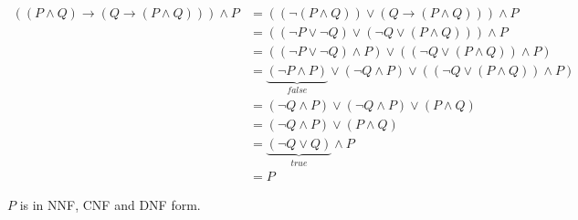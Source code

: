 \documentclass[a4paper,11pt]{report}
\begin{document}
\begin{align*}
  ((P \wedge Q) \to (Q \to (P \wedge Q))) \wedge P &= (( \neg(P \wedge Q)) \vee (Q \to (P \wedge Q))) \wedge P \\
                                                   &= ((\neg P \vee \neg Q) \vee (\neg Q \vee (P \wedge Q))) \wedge P\\
                                                   &= ((\neg P \vee \neg Q) \wedge P) \vee ((\neg Q \vee (P \wedge Q)) \wedge P)\\
                                                   &= \underbrace{(\neg P \wedge P)}_{false} \vee (\neg Q \wedge P) \vee ((\neg Q \vee (P \wedge Q)) \wedge P)\\
                                                   &= (\neg Q \wedge P) \vee (\neg Q \wedge P) \vee (P \wedge Q)\\
                                                   &= (\neg Q \wedge P) \vee (P \wedge Q)\\
                                                   &= \underbrace{(\neg Q \vee Q)}_{true} \wedge P\\
                                                   &= P
\end{align*}

$P$ is in NNF, CNF and DNF form.
\end{document}
